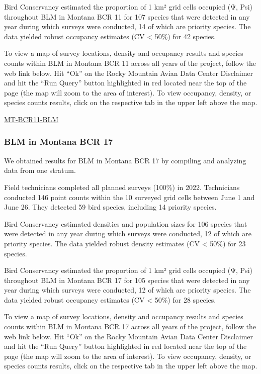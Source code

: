 \documentclass[
  letterpaper,
  DIV=11,
  numbers=noendperiod,
  oneside]{scrreprt}
\begin{document}
Bird Conservancy estimated the proportion of 1 km² grid cells occupied
(Ψ, Psi) throughout BLM in Montana BCR 11 for 107 species that were
detected in any year during which surveys were conducted, 14 of which
are priority species. The data yielded robust occupancy estimates (CV
\textless{} 50\%) for 42 species.

To view a map of survey locations, density and occupancy results and
species counts within BLM in Montana BCR 11 across all years of the
project, follow the web link below. Hit ``Ok'' on the Rocky Mountain
Avian Data Center Disclaimer and hit the ``Run Query'' button
highlighted in red located near the top of the page (the map will zoom
to the area of interest). To view occupancy, density, or species counts
results, click on the respective tab in the upper left above the map.

\href{http://www.rmbo.org/new_site/adc/QueryWindow.aspx\#N4IgzgrgDgpgTmALnAhoiBbEAuABCAWQBUBaAIQGEAlARhvIBkCQBfIA}{MT-BCR11-BLM}

\hypertarget{blm-in-montana-bcr-17}{%
\subsubsection{BLM in Montana BCR 17}\label{blm-in-montana-bcr-17}}

We obtained results for BLM in Montana BCR 17 by compiling and analyzing
data from one stratum.

Field technicians completed all planned surveys (100\%) in 2022.
Technicians conducted 146 point counts within the 10 surveyed grid cells
between June 1 and June 26. They detected 59 bird species, including 14
priority species.

Bird Conservancy estimated densities and population sizes for 106
species that were detected in any year during which surveys were
conducted, 12 of which are priority species. The data yielded robust
density estimates (CV \textless{} 50\%) for 23 species.

Bird Conservancy estimated the proportion of 1 km² grid cells occupied
(Ψ, Psi) throughout BLM in Montana BCR 17 for 105 species that were
detected in any year during which surveys were conducted, 12 of which
are priority species. The data yielded robust occupancy estimates (CV
\textless{} 50\%) for 28 species.

To view a map of survey locations, density and occupancy results and
species counts within BLM in Montana BCR 17 across all years of the
project, follow the web link below. Hit ``Ok'' on the Rocky Mountain
Avian Data Center Disclaimer and hit the ``Run Query'' button
highlighted in red located near the top of the page (the map will zoom
to the area of interest). To view occupancy, density, or species counts
results, click on the respective tab in the upper left above the map.
\end{document}
